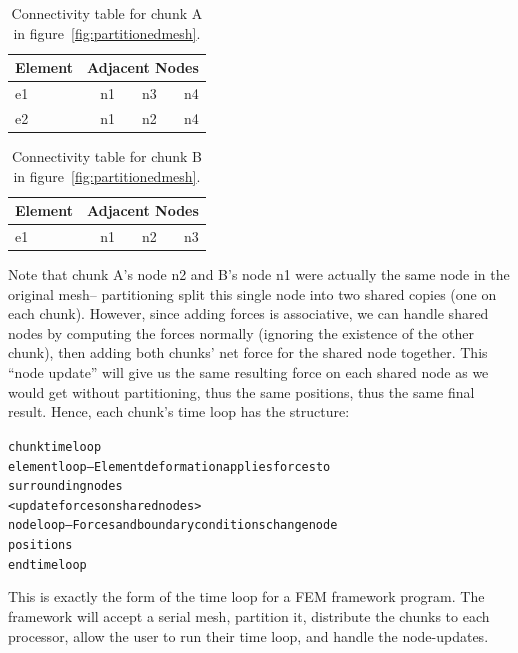 \documentclass[10pt]{article}
\begin{document}
\begin{table}[h]
\begin{center}
\begin{tabular}{||l||r|r|r||}\hline
Element & \multicolumn{3}{c||}{Adjacent Nodes} \\\hline
e1 & n1 & n3 & n4 \\
e2 & n1 & n2 & n4 \\
\hline
\end{tabular}
\end{center}
\caption{Connectivity table for chunk A in figure~\ref{fig:partitionedmesh}.}
\label{table:chunkA}
\end{table}

\begin{table}[h]
\begin{center}
\begin{tabular}{||l||r|r|r||}\hline
Element & \multicolumn{3}{c||}{Adjacent Nodes}\\\hline
e1 & n1 & n2 & n3 \\
\hline
\end{tabular}
\end{center}
\caption{Connectivity table for chunk B in figure~\ref{fig:partitionedmesh}.}
\label{table:chunkB}
\end{table}

Note that chunk A's node n2 and B's node n1 were actually the same node in
the original mesh-- partitioning split this single node into two shared
copies (one on each chunk).  However, since adding forces is associative, we
can handle shared nodes by computing the forces normally (ignoring the
existence of the other chunk), then adding both chunks' net force for the
shared node together.  This ``node update'' will give us the same resulting
force on each shared node as we would get without partitioning, thus the
same positions, thus the same final result.  Hence, each chunk's time loop
has the structure:

\begin{alltt}
     chunk time loop
          element loop-- Element deformation applies forces to
          surrounding nodes
          <update forces on shared nodes>
          node loop-- Forces and boundary conditions change node
          positions
     end time loop
\end{alltt}

This is exactly the form of the time loop for a \charmpp{} FEM framework
program.  The framework will accept a serial mesh, partition it, distribute
the chunks to each processor, allow the user to run their time loop, and
handle the node-updates.
\end{document}

